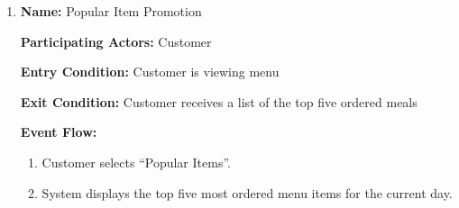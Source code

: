\documentclass[11pt]{article}
\begin{document}
\begin{enumerate}
		\item \textbf{Name:} 				Popular Item Promotion

			\textbf{Participating Actors:} 	Customer

			\textbf{Entry Condition:} 		Customer is viewing menu

			\textbf{Exit Condition:} 		Customer receives a list of the top five ordered meals

			\textbf{Event Flow:}
			\begin{enumerate}
				\setlength{\leftskip}{1cm}
				\item Customer selects ``Popular Items''.
				\item System displays the top five most ordered menu items for the current day. 
			\end{enumerate}
	\end{enumerate}

	
\end{document}
